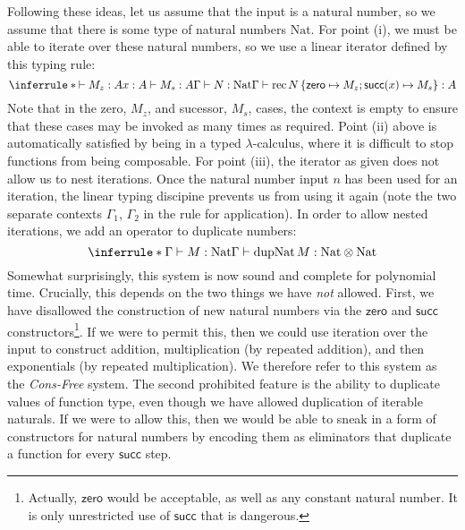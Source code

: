 \documentclass[acmsmall,review,screen,anonymous]{acmart}
\newcommand{\tmRec}{\mathrm{rec}}
\newcommand{\tyNat}{\mathrm{Nat}}
\newcommand{\conZero}{\mathsf{zero}}
\newcommand{\conSucc}{\mathsf{succ}}
\newcommand{\dupNat}{\mathrm{dupNat}}
\begin{document}
Following these ideas, let us assume that the input is a natural
number, so we assume that there is some type of natural numbers
$\tyNat$. For point (i), we must be able to iterate over these natural
numbers, so we use a linear iterator defined by this typing rule:
\begin{displaymath}
  \inferrule*
  {\vdash M_z : A \\ x : A \vdash M_s : A \\ \Gamma \vdash N : \tyNat}
  {\Gamma \vdash \tmRec\,N\,\{\conZero \mapsto M_z; \conSucc(x) \mapsto M_s\} : A}
\end{displaymath}
Note that in the zero, $M_z$, and sucessor, $M_s$, cases, the context
is empty to ensure that these cases may be invoked as many times as
required. Point (ii) above is automatically satisfied by being in a
typed $\lambda$-calculus, where it is difficult to stop functions from
being composable. For point (iii), the iterator as given does not
allow us to nest iterations. Once the natural number input $n$ has
been used for an iteration, the linear typing discipine prevents us
from using it again (note the two separate contexts $\Gamma_1$,
$\Gamma_2$ in the rule for application). In order to allow nested
iterations, we add an operator to duplicate numbers:
\begin{displaymath}
  \inferrule*
  {\Gamma \vdash M : \tyNat}
  {\Gamma \vdash \dupNat\,M : \tyNat \otimes \tyNat}
\end{displaymath}
Somewhat surprisingly, this system is now sound and complete for
polynomial time. Crucially, this depends on the two things we have
\emph{not} allowed. First, we have disallowed the construction of new
natural numbers via the $\conZero$ and $\conSucc$
constructors\footnote{Actually, $\conZero$ would be acceptable, as
  well as any constant natural number. It is only unrestricted use of
  $\conSucc$ that is dangerous.}. If we were to permit this, then we
could use iteration over the input to construct addition,
multiplication (by repeated addition), and then exponentials (by
repeated multiplication). We therefore refer to this system as the
\emph{Cons-Free} system.  The second prohibited feature is the ability
to duplicate values of function type, even though we have allowed
duplication of iterable naturals. If we were to allow this, then we
would be able to sneak in a form of constructors for natural numbers
by encoding them as eliminators that duplicate a function for every
$\conSucc$ step.
\end{document}
